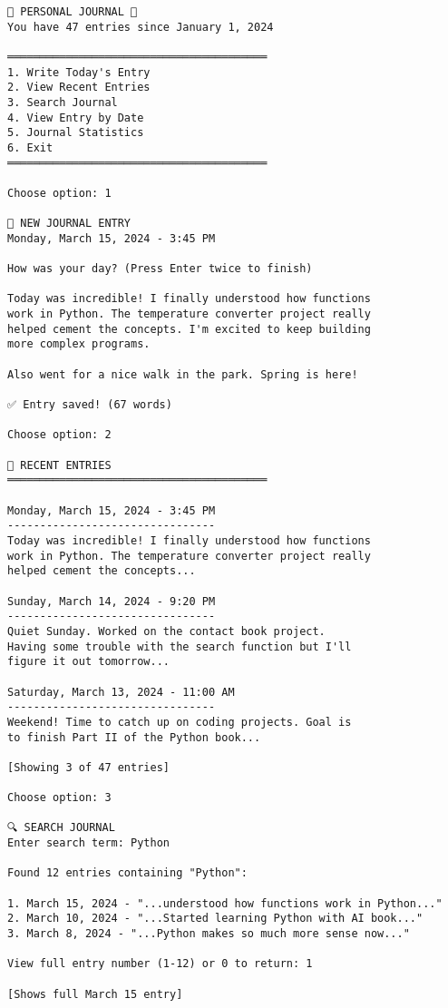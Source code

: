 \documentclass[
  letterpaper,
  DIV=11,
  numbers=noendperiod,
  oneside]{scrreprt}
\begin{document}
\begin{verbatim}
📖 PERSONAL JOURNAL 📖
You have 47 entries since January 1, 2024

════════════════════════════════════════
1. Write Today's Entry
2. View Recent Entries
3. Search Journal
4. View Entry by Date
5. Journal Statistics
6. Exit
════════════════════════════════════════

Choose option: 1

📝 NEW JOURNAL ENTRY
Monday, March 15, 2024 - 3:45 PM

How was your day? (Press Enter twice to finish)

Today was incredible! I finally understood how functions 
work in Python. The temperature converter project really 
helped cement the concepts. I'm excited to keep building
more complex programs.

Also went for a nice walk in the park. Spring is here!

✅ Entry saved! (67 words)

Choose option: 2

📖 RECENT ENTRIES
════════════════════════════════════════

Monday, March 15, 2024 - 3:45 PM
--------------------------------
Today was incredible! I finally understood how functions 
work in Python. The temperature converter project really 
helped cement the concepts...

Sunday, March 14, 2024 - 9:20 PM
--------------------------------
Quiet Sunday. Worked on the contact book project.
Having some trouble with the search function but I'll
figure it out tomorrow...

Saturday, March 13, 2024 - 11:00 AM
--------------------------------
Weekend! Time to catch up on coding projects. Goal is
to finish Part II of the Python book...

[Showing 3 of 47 entries]

Choose option: 3

🔍 SEARCH JOURNAL
Enter search term: Python

Found 12 entries containing "Python":

1. March 15, 2024 - "...understood how functions work in Python..."
2. March 10, 2024 - "...Started learning Python with AI book..."
3. March 8, 2024 - "...Python makes so much more sense now..."

View full entry number (1-12) or 0 to return: 1

[Shows full March 15 entry]
\end{verbatim}
\end{document}
